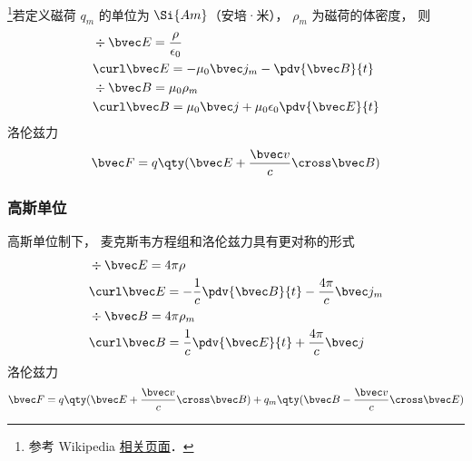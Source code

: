 
\begin{issues}
\issueDraft
\end{issues}


\footnote{参考 Wikipedia \href{https://en.wikipedia.org/wiki/Magnetic_monopole}{相关页面}．}若定义磁荷 $q_m$ 的单位为 $\Si{Am}$（安培·米）， $\rho_m$ 为磁荷的体密度， 则
\begin{equation}
\begin{aligned}
&\div \bvec E = \frac{\rho}{\epsilon_0}\\
&\curl \bvec E = - \mu_0 \bvec j_m -\pdv{\bvec B}{t}\\
&\div \bvec B = \mu_0 \rho_m \\
&\curl \bvec B = \mu_0 \bvec j + \mu_0\epsilon_0 \pdv{\bvec E}{t}
\end{aligned}
\end{equation}
洛伦兹力
\begin{equation}
\bvec F = q \qty(\bvec E + \frac{\bvec v}{c}\cross \bvec B)
\end{equation}

\subsubsection{高斯单位}
高斯单位制下， 麦克斯韦方程组和洛伦兹力具有更对称的形式
\begin{equation}
\begin{aligned}
&\div \bvec E = 4\pi\rho\\
&\curl \bvec E = -\frac{1}{c}\pdv{\bvec B}{t}  - \frac{4\pi}{c}\bvec j_m\\
&\div \bvec B = 4\pi\rho_m \\
&\curl \bvec B = \frac{1}{c}\pdv{\bvec E}{t} + \frac{4\pi}{c} \bvec j
\end{aligned}
\end{equation}
洛伦兹力
\begin{equation}
\bvec F = q \qty(\bvec E + \frac{\bvec v}{c}\cross \bvec B) + q_m \qty(\bvec B - \frac{\bvec v}{c}\cross \bvec E)
\end{equation}
